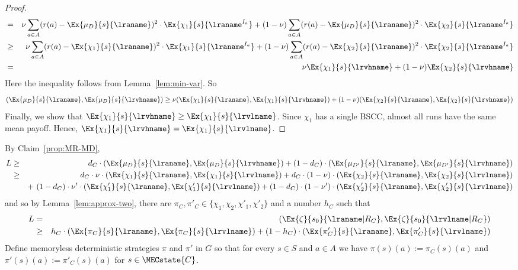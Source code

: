 \begin{proof}
\begin{eqnarray*}
  & = & \nu \sum_{a\in A} (r(a)-\Ex{\mu_D}{s}{\lraname})^2\cdot \Ex{\chi_1}{s}{\lraname^{I_a}} +
  (1-\nu) \sum_{a\in A} (r(a)-\Ex{\mu_D}{s}{\lraname})^2\cdot \Ex{\chi_2}{s}{\lraname^{I_a}} \\
  & \geq & \nu \sum_{a\in A} (r(a)-\Ex{\chi_1}{s}{\lraname})^2\cdot \Ex{\chi_1}{s}{\lraname^{I_a}} +
  (1-\nu) \sum_{a\in A} (r(a)-\Ex{\chi_2}{s}{\lraname})^2\cdot \Ex{\chi_2}{s}{\lraname^{I_a}} \\
  & = & \nu \Ex{\chi_1}{s}{\lrvhname} +
  (1-\nu) \Ex{\chi_2}{s}{\lrvhname}
\end{eqnarray*}
Here the inequality follows from Lemma~\ref{lem:min-var}. So
\[
(\Ex{\mu_D}{s}{\lraname},\Ex{\mu_D}{s}{\lrvhname})\geq \nu (\Ex{\chi_1}{s}{\lraname},\Ex{\chi_1}{s}{\lrvhname}) + (1-\nu) (\Ex{\chi_2}{s}{\lraname},\Ex{\chi_2}{s}{\lrvhname})
\]
Finally, we show that $\Ex{\chi_1}{s}{\lrvhname}\geq \Ex{\chi_1}{s}{\lrvlname}$. Since $\chi_1$ has a single BSCC, almost all runs have the same mean payoff. Hence, $\Ex{\chi_1}{s}{\lrvhname}= \Ex{\chi_1}{s}{\lrvlname}$.
\end{proof}
\noindent
By Claim~\ref{prop:MR-MD},
 \begin{eqnarray*}
 L & \geq & d_C\cdot (\Ex{\mu_D}{s}{\lraname}, \Ex{\mu_D}{s}{\lrvhname}) +(1-d_C)\cdot
  (\Ex{\mu_{D'}}{s}{\lraname}, \Ex{\mu_{D'}}{s}{\lrvhname}) \\
   & \geq & d_C\cdot \nu\cdot (\Ex{\chi_1}{s}{\lraname}, \Ex{\chi_1}{s}{\lrvlname})
    +  d_C\cdot (1-\nu) \cdot (\Ex{\chi_2}{s}{\lraname}, \Ex{\chi_2}{s}{\lrvlname}) \\
   & & +\  (1-d_C) \cdot \nu' \cdot (\Ex{\chi'_1}{s}{\lraname}, \Ex{\chi'_1}{s}{\lrvlname})
    + (1-d_C) \cdot (1-\nu') \cdot (\Ex{\chi'_2}{s}{\lraname}, \Ex{\chi'_2}{s}{\lrvlname})
 \end{eqnarray*}
and so by Lemma~\ref{lem:approx-two}, there are $\pi_C, \pi'_C \in \{\chi_1,\chi_2,\chi'_1,\chi'_2\}$ and a number $h_C$ such that
\begin{eqnarray*}
L &= & (\Ex{\zeta}{s_0}{\lraname|R_C}, \Ex{\zeta}{s_0}{\lrvlname|R_C}) \\
  & \ge & h_C\cdot (\Ex{\pi_C}{s}{\lraname}, \Ex{\pi_C}{s}{\lrvlname}) + (1-h_C)\cdot (\Ex{\pi'_C}{s}{\lraname}, \Ex{\pi'_C}{s}{\lrvlname})
\end{eqnarray*}
Define memoryless deterministic strategies $\pi$ and $\pi'$ in $G$ so that for every $s\in S$ and $a\in A$ we have
$\pi(s)(a):=\pi_C(s)(a)$ and $\pi'(s)(a):=\pi'_C(s)(a)$ for $s\in \MECstate{C}$.





